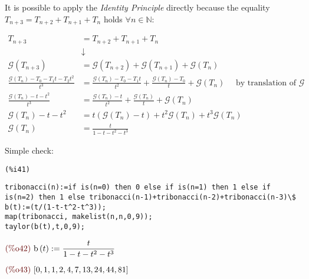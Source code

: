 It is possible to apply the \emph{Identity Principle} directly because
the equality $T_{n+3} = T_{n+2} + T_{n+1} + T_{n}$ holds $\forall n
\in \mathbb{N} $:

\begin{displaymath}
  \begin{split}
    T_{n+3} &=T_{n+2}+ T_{n+1} + T_{n}  \\
    &\downarrow \\
    \mathcal{G} (T_{n+3}) &= \mathcal{G} (T_{n+2}) + \mathcal{G}
    (T_{n+1}) + \mathcal{G}
    (T_{n}) \\
    \frac{\mathcal{G} (T_n) - T_0 - T_1 t - T_2t^2}{t^3} &=
    \frac{\mathcal{G} (T_n) - T_0 - T_1 t}{t^2} + \frac{\mathcal{G}
      (T_n) - T_0}{t} + \mathcal{G}
    (T_{n}) \quad \text{ by translation of } \mathcal{G} \\
    \frac{\mathcal{G} (T_n) - t - t^2}{t^3} &= \frac{\mathcal{G} (T_n)
      - t}{t^2} + \frac{\mathcal{G} (T_n) }{t} + \mathcal{G}
    (T_{n})\\
    \mathcal{G} (T_n) - t - t^2 &= t(\mathcal{G} (T_n) - t) +
    t^2\mathcal{G} (T_n) + t^3\mathcal{G}
    (T_{n})\\
    \mathcal{G} (T_n) &= \frac{t}{1-t-t^2-t^3
}
  \end{split}
\end{displaymath}

Simple check:

\noindent
\begin{minipage}[t]{8ex}{\color{red}\bf
\begin{verbatim}
(%i41) 
\end{verbatim}}
\end{minipage}
\begin{minipage}[t]{\textwidth}{\color{blue}
\begin{verbatim}
tribonacci(n):=if is(n=0) then 0 else if is(n=1) then 1 else if
is(n=2) then 1 else tribonacci(n-1)+tribonacci(n-2)+tribonacci(n-3)\$
b(t):=(t/(1-t-t^2-t^3));
map(tribonacci, makelist(n,n,0,9));
taylor(b(t),t,0,9);
\end{verbatim}}
\end{minipage}
\begin{math}\displaystyle
\parbox{8ex}{\color{labelcolor}(\%o42) }
\mathrm{b}\left( t\right) :=\frac{t}{1-t-{t}^{2}-{t}^{3}}
\end{math}

\begin{math}\displaystyle
\parbox{8ex}{\color{labelcolor}(\%o43) }
[0,1,1,2,4,7,13,24,44,81]
\end{math}

